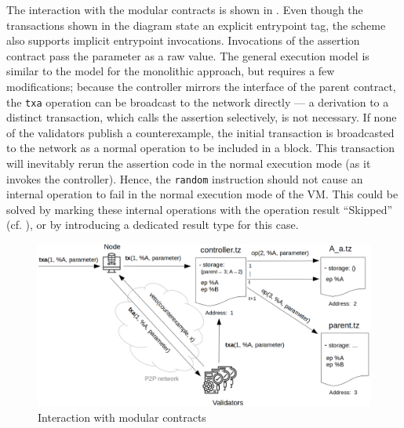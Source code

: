 The interaction with the modular contracts is shown in . Even though the transactions shown in the diagram state an explicit entrypoint tag, the scheme also supports implicit entrypoint invocations. Invocations of the assertion contract pass the parameter as a raw value. The general execution model is similar to the model for the monolithic approach, but requires a few modifications; because the controller mirrors the interface of the parent contract, the \texttt{txa} operation can be broadcast to the network directly --- a derivation to a distinct transaction, which calls the assertion selectively, is not necessary. If none of the validators publish a counterexample, the initial transaction is broadcasted to the network as a normal operation to be included in a block. This transaction will inevitably rerun the assertion code in the normal execution mode (as it invokes the controller). Hence, the \texttt{random} instruction should not cause an internal operation to fail in the normal execution mode of the VM. This could be solved by marking these internal operations with the operation result ``Skipped'' (cf. ), or by introducing a dedicated result type for this case. 
\begin{figure}[h]
\centering
  \includegraphics[width=\textwidth]{figures/5-offline_tezos/interaction_modular.png}
	\caption{Interaction with modular contracts}
	\label{fig:interaction_modular}
\end{figure}

